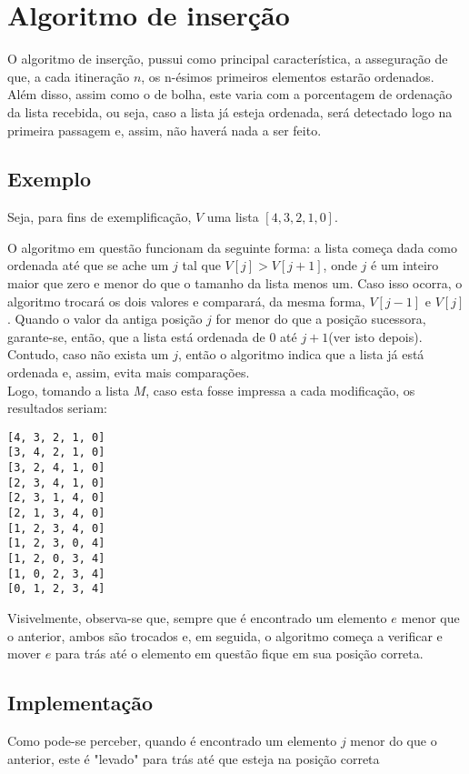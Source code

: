 \section{Algoritmo de inserção}
O algoritmo de inserção, pussui como principal característica, a asseguração de que, a cada itineração $n$, os n-ésimos primeiros elementos estarão ordenados. Além disso, assim como o de bolha, este varia com a porcentagem de ordenação da lista recebida, ou seja, caso a lista já esteja ordenada, será detectado logo na primeira passagem e, assim, não haverá nada a ser feito. 


\subsection{Exemplo}
Seja, para fins de exemplificação, $V$ uma lista $[4,3,2,1,0]$.  

O algoritmo em questão funcionam da seguinte forma: a lista começa dada como ordenada até que se ache um $j$ tal que $V[j]>V[j+1]$, onde $j$ é um inteiro maior que zero e menor do que o tamanho da lista menos um. 
Caso isso ocorra, o algoritmo trocará os dois valores e comparará, da mesma forma, $V[j-1]$ e $V[j]$. Quando o valor da antiga posição $j$ for menor do que a posição sucessora, garante-se, então, que a lista está ordenada de 0 até $j+1$(ver isto depois). Contudo, caso não exista um $j$, então o algoritmo indica que a lista já está ordenada e, assim, evita mais comparações.
\\

Logo, tomando a lista $M$, caso esta fosse impressa a cada modificação, os resultados seriam:
\begin{lstlisting}
[4, 3, 2, 1, 0]
[3, 4, 2, 1, 0]
[3, 2, 4, 1, 0]
[2, 3, 4, 1, 0]
[2, 3, 1, 4, 0]
[2, 1, 3, 4, 0]
[1, 2, 3, 4, 0]
[1, 2, 3, 0, 4]
[1, 2, 0, 3, 4]
[1, 0, 2, 3, 4]
[0, 1, 2, 3, 4]
\end{lstlisting}

Visivelmente, observa-se que, sempre que é encontrado um elemento $e$ menor que o anterior, ambos são trocados e, em seguida, o algoritmo começa a verificar e mover $e$ para trás até o elemento em questão fique em sua posição correta.
\newpage

\subsection{Implementação}
Como pode-se perceber, quando é encontrado um elemento $j$ menor do que o anterior, este é "levado" para trás até que esteja na posição correta

